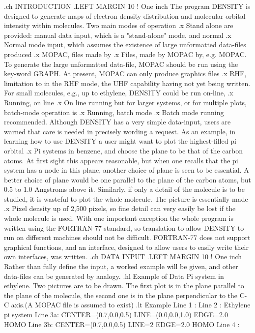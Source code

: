 .ch  INTRODUCTION
.LEFT MARGIN 10                 ! One inch
 The program DENSITY is designed to generate maps of electron density distribution
and molecular orbital intensity within molecules. Two main modes of operation
.x Stand alone
are provided: manual data input, which is a "stand-alone" mode, and normal
.x Normal mode
input, which assumes the existence of large unformatted data-files produced 
.x MOPAC, files made by
.x Files, made by MOPAC
by, e.g. MOPAC.
 To generate the large unformatted data-file, MOPAC should be run using
the key-word GRAPH. At present, MOPAC can only produce graphics files
.x RHF, limitation to
in the RHF mode, the UHF capability having not yet being written.
 For small molecules, e.g., up to ethylene, DENSITY could be run on-line,
.x Running, on line
.x On line running
but for larger systems, or for multiple plots, batch-mode operation is 
.x Running, batch mode 
.x Batch mode running
recommended. 
  Although DENSITY has a very simple data-input, users are warned that
care is needed in precisely wording a request. As an example, in learning
how to use DENSITY a user might want to plot the highest-filled pi orbital
.x Pi systems
in benzene, and choose the plane to be that of the carbon atoms. At first
sight this appears reasonable, but when one recalls that the pi system has
a node in this plane, another choice of plane is seen to be essential.
A better choice of plane would be one parallel to the plane of the carbon 
atoms, but 0.5 to 1.0 Angstroms above it.
 Similarly, if only a detail of the molecule is to be studied, it is
wasteful to plot the whole molecule. The picture is essentially made
.x Pixel density
up of 2,500 pixels, so fine detail can very easily be lost if the whole
molecule is used.
 With one important exception the whole program is written using the
FORTRAN-77 standard, so translation to allow DENSITY to run
on different machines should not be difficult. FORTRAN-77 does not
support graphical functions, and an interface, designed to allow
users to easily write their own interfaces, was written.
.ch DATA INPUT
.LEFT MARGIN 10                 ! One inch
 Rather than fully define the input, a worked example will be given,
and other data-files can be generated by analogy.
.hl Example of Data
 Pi system in ethylene. Two pictures are to be drawn. 
The first plot is in the plane parallel 
to the plane of the molecule, the second one is in the plane perpendicular to
the C-C axis.(A MOPAC file is assumed to exist)
.lt
               Example
Line 1 :    
Line 2 :  Ethylene pi system
Line 3a:  CENTER=(0.7,0.0,0.5) LINE=(0.0,0.0,1.0) EDGE=2.0 HOMO
Line 3b:  CENTER=(0.7,0.0,0.5) LINE=2 EDGE=2.0 HOMO
Line 4 :

